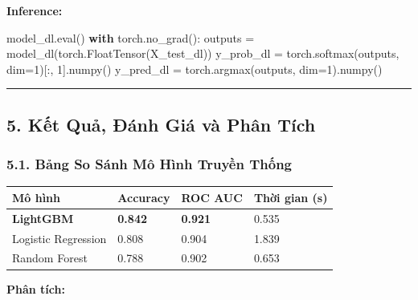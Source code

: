 \documentclass[
]{article}
\newenvironment{Shaded}{}{}
\newcommand{\BuiltInTok}[1]{\textcolor[rgb]{0.00,0.50,0.00}{#1}}
\newcommand{\ControlFlowTok}[1]{\textcolor[rgb]{0.00,0.44,0.13}{\textbf{#1}}}
\newcommand{\DecValTok}[1]{\textcolor[rgb]{0.25,0.63,0.44}{#1}}
\newcommand{\NormalTok}[1]{#1}
\newcommand{\OperatorTok}[1]{\textcolor[rgb]{0.40,0.40,0.40}{#1}}
\newcounter{none} %
\begin{document}
\textbf{Inference:}

\begin{Shaded}
\begin{Highlighting}[]
\NormalTok{model\_dl.}\BuiltInTok{eval}\NormalTok{()}
\ControlFlowTok{with}\NormalTok{ torch.no\_grad():}
\NormalTok{    outputs }\OperatorTok{=}\NormalTok{ model\_dl(torch.FloatTensor(X\_test\_dl))}
\NormalTok{    y\_prob\_dl }\OperatorTok{=}\NormalTok{ torch.softmax(outputs, dim}\OperatorTok{=}\DecValTok{1}\NormalTok{)[:, }\DecValTok{1}\NormalTok{].numpy()}
\NormalTok{    y\_pred\_dl }\OperatorTok{=}\NormalTok{ torch.argmax(outputs, dim}\OperatorTok{=}\DecValTok{1}\NormalTok{).numpy()}
\end{Highlighting}
\end{Shaded}

\begin{center}\rule{0.5\linewidth}{0.5pt}\end{center}

\subsection{5. Kết Quả, Đánh Giá và Phân
Tích}\label{5-kux1ebft-quux1ea3-ux111uxe1nh-giuxe1-vuxe0-phuxe2n-tuxedch}

\subsubsection{5.1. Bảng So Sánh Mô Hình Truyền
Thống}\label{51-bux1ea3ng-so-suxe1nh-muxf4-huxecnh-truyux1ec1n-thux1ed1ng}

{\def\LTcaptype{none} %
\begin{longtable}[]{@{}llll@{}}
\toprule\noalign{}
Mô hình & Accuracy & ROC AUC & Thời gian (s) \\
\midrule\noalign{}
\endhead
\bottomrule\noalign{}
\endlastfoot
\textbf{LightGBM} & \textbf{0.842} & \textbf{0.921} & 0.535 \\
Logistic Regression & 0.808 & 0.904 & 1.839 \\
Random Forest & 0.788 & 0.902 & 0.653 \\
\end{longtable}
}

\textbf{Phân tích:}
\end{document}
